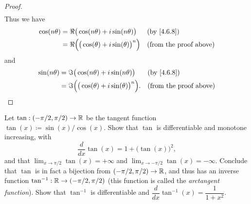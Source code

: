 \begin{proof}
\begin{align*}
  \end{align*}
  Thus we have
  \begin{align*}
    \cos(n \theta) & = \Re\big(\cos(n \theta) + i \sin(n \theta)\big)         &  & \by{4.6.8}                    \\
                   & = \Re\Big(\big(\cos(\theta) + i \sin(\theta)\big)^n\Big) &  & \text{(from the proof above)}
  \end{align*}
  and
  \begin{align*}
    \sin(n \theta) & = \Im\big(\cos(n \theta) + i \sin(n \theta)\big)          &  & \by{4.6.8}                    \\
                   & = \Im\Big(\big(\cos(\theta) + i \sin(\theta)\big)^n\Big). &  & \text{(from the proof above)}
  \end{align*}
\end{proof}

\begin{ex}\label{ex:4.7.8}
  Let \(\tan : (- \pi / 2, \pi / 2) \to \mathbb{R}\) be the tangent function \(\tan(x) \coloneqq \sin(x) / \cos(x)\).
  Show that \(\tan\) is differentiable and monotone increasing, with
  \[
    \dfrac{d}{dx} \tan(x) = 1 + \big(\tan(x)\big)^2,
  \]
  and that \(\lim_{x \to \pi / 2} \tan(x) = +\infty\) and \(\lim_{x \to -\pi / 2} \tan(x) = -\infty\).
  Conclude that \(\tan\) is in fact a bijection from \((- \pi / 2, \pi / 2) \to \mathbb{R}\), and thus has an inverse function \(\tan^{-1} : \mathbb{R} \to (- \pi / 2, \pi / 2)\)
  (this function is called the \emph{arctangent function}).
  Show that \(\tan^{-1}\) is differentiable and \(\dfrac{d}{dx} \tan^{-1}(x) = \dfrac{1}{1 + x^2}\).
\end{ex}

